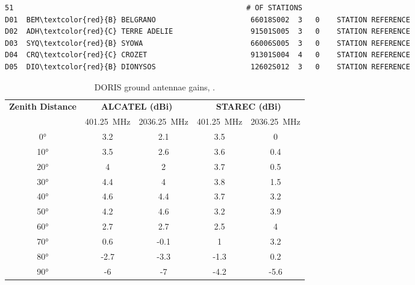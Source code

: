 \begin{adjustbox}{max width=\linewidth , fbox=0.5pt}
\begin{BVerbatim}[commandchars=\\\{\}]
    51                                                      # OF STATIONS       
D01  BEM\textcolor{red}{B} BELGRANO                      66018S002  3   0    STATION REFERENCE   
D02  ADH\textcolor{red}{C} TERRE ADELIE                  91501S005  3   0    STATION REFERENCE   
D03  SYQ\textcolor{red}{B} SYOWA                         66006S005  3   0    STATION REFERENCE   
D04  CRQ\textcolor{red}{C} CROZET                        91301S004  4   0    STATION REFERENCE   
D05  DIO\textcolor{red}{B} DIONYSOS                      12602S012  3   0    STATION REFERENCE
\end{BVerbatim}
\end{adjustbox}

\begin{table}[h!]
    \centering
    \begin{tabular}{|c | c | c | c | c|}
        \hline
        \textbf{Zenith Distance} & \multicolumn{2}{c}{\textbf{ALCATEL (dBi)}} & \multicolumn{2}{c|}{\textbf{STAREC (dBi)}} \\
                        & \SI{401.25}{\mega\hertz} & \SI{2036.25}{\mega\hertz} &  \SI{401.25}{\mega\hertz} & \SI{2036.25}{\mega\hertz}\\
        \hline
        \ang{0}&3.2&2.1&3.5&0 \\
        \ang{10}&3.5&2.6&3.6&0.4\\
        \ang{20}&4&2&3.7&0.5\\
        \ang{30}&4.4&4&3.8&1.5\\
        \ang{40}&4.6&4.4&3.7&3.2\\
        \ang{50}&4.2&4.6&3.2&3.9\\
        \ang{60}&2.7&2.7&2.5&4\\
        \ang{70}&0.6&-0.1&1&3.2\\
        \ang{80}&-2.7&-3.3&-1.3&0.2\\
        \ang{90}&-6&-7&-4.2&-5.6\\
        \hline
    \end{tabular}
    \caption{DORIS ground antennae gains, \cite{DORISGSM}.}
    \label{table:antenna-gains}
\end{table}

